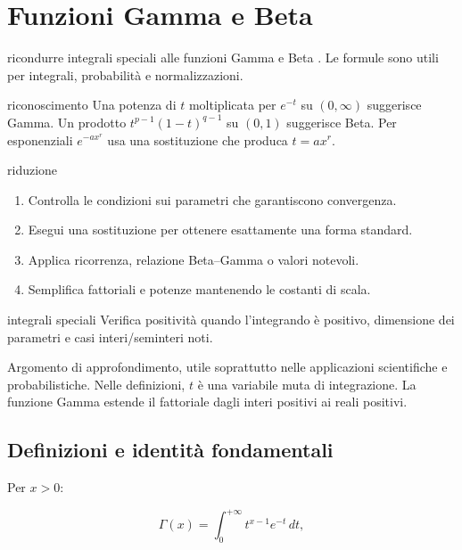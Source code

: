 \chapter{Funzioni Gamma e Beta}
\label{chap:19}

\begin{obiettivocapitolo}{ricondurre integrali speciali alle funzioni Gamma e Beta}
\estensione. Le formule sono utili per integrali, probabilità e normalizzazioni.
\end{obiettivocapitolo}
\begin{sceltametodo}{riconoscimento}
Una potenza di $t$ moltiplicata per $e^{-t}$ su $(0,\infty)$ suggerisce Gamma. Un prodotto $t^{p-1}(1-t)^{q-1}$ su $(0,1)$ suggerisce Beta. Per esponenziali $e^{-a x^r}$ usa una sostituzione che produca $t=a x^r$.
\end{sceltametodo}
\begin{proceduraesame}{riduzione}
\begin{enumerate}
\item Controlla le condizioni sui parametri che garantiscono convergenza.
\item Esegui una sostituzione per ottenere esattamente una forma standard.
\item Applica ricorrenza, relazione Beta--Gamma o valori notevoli.
\item Semplifica fattoriali e potenze mantenendo le costanti di scala.
\end{enumerate}
\end{proceduraesame}
\begin{controllofinale}{integrali speciali}
Verifica positività quando l'integrando è positivo, dimensione dei parametri e casi interi/seminteri noti.
\end{controllofinale}

Argomento di approfondimento, utile soprattutto nelle applicazioni scientifiche e probabilistiche. Nelle definizioni, \(t\) è una variabile muta di integrazione. La funzione Gamma estende il fattoriale dagli interi positivi ai reali positivi.

\section{Definizioni e identità fondamentali}\label{definizioni-e-identituxe0-fondamentali}

Per \(x>0\):

\[
\displaystyle
\Gamma(x)
=
\int_0^{+\infty}t^{x-1}e^{-t}\,dt,
\]

